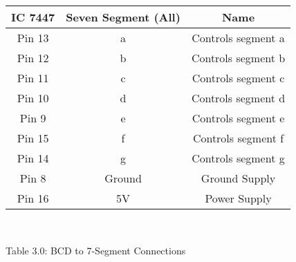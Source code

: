 \centering
\begin{tabular}{|c|c|c|}
\hline
IC 7447 & Seven Segment (All) & Name\\
\hline
Pin 13 & a & Controls segment a\\
\hline
Pin 12 & b & Controls segment b\\
\hline
Pin 11 & c & Controls segment c\\
\hline
Pin 10 & d & Controls segment d\\
\hline
Pin 9 & e & Controls segment e\\
\hline
Pin 15 & f & Controls segment f\\
\hline
Pin 14 & g & Controls segment g\\
\hline
Pin 8 & Ground & Ground Supply\\
\hline
Pin 16 & 5V & Power Supply\\
\hline
\end{tabular}\\
\centerline{Table 3.0: BCD to 7-Segment Connections}
